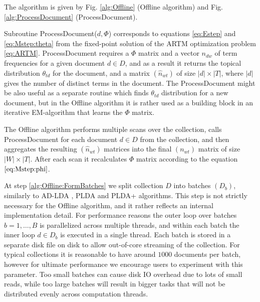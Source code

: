 \documentclass[russian,english]{llncs}
\newcommand{\kw}[1]{\textsf{#1}}
\begin{document}
The algorithm is given by
Fig. \ref{alg:Offline} (\kw{Offline algorithm}) and
Fig. \ref{alg:ProcessDocument} (\kw{ProcessDocument}).

Subroutine \kw{ProcessDocument($d, \Phi$)} corresponds to equations \eqref{eq:Estep} and \eqref{eq:Mstep:theta} from the fixed-point solution of the ARTM optimization problem \eqref{eq:ARTM}.
\kw{ProcessDocument} requires a $\Phi$ matrix
and a vector $n_{dw}$ of term frequencies for a given document $d \in D$,
and as a result it returns the topical distribution $\theta_{td}$ for the document,
and a matrix $(\hat n_{wt})$ of size $|d| \times |T|$,
where $|d|$ gives the number of distinct terms in the document.
The \kw{ProcessDocument} might be also useful as a separate routine which finds $\theta_{td}$ distribution for a new document,
but in the \kw{Offline algorithm} it is rather used as a building block in an iterative EM-algorithm that learns the $\Phi$ matrix.

The \kw{Offline algorithm} performs multiple scans over the collection, calls \kw{ProcessDocument}
for each document $d \in D$ from the collection,
and then aggregates the resulting $(\hat n_{wt})$ matrices into the final $(n_{wt})$ matrix of size $|W| \times |T|$.
After each scan it recalculates $\Phi$ matrix according to the equation $\eqref{eq:Mstep:phi}$.


At step \ref{alg:Offline:FormBatches} we split collection $D$ into batches $(D_b)$,
similarly to AD-LDA \cite{newman09distributed},
PLDA \cite{wang09plda} and PLDA{+} \cite{liu11plda} algorithms.
This step is not strictly necessary for the \kw{Offline algorithm},
and it rather reflects an internal implementation detail.
For performance reasons the outer loop over batches $b = 1, \dots, B$ is parallelized across multiple threads,
and within each batch the inner loop $d \in D_b$ is executed in a single thread.
Each batch is stored in a separate disk file on disk to allow out-of-core streaming of the collection.
For typical collections it is reasonable to have around $1000$ documents per batch,
however for ultimate performance we encourage users to experiment with this parameter.
Too small batches can cause disk IO overhead due to lots of small reads,
while too large batches will result in bigger tasks that will not be distributed evenly across computation threads.
\end{document}
